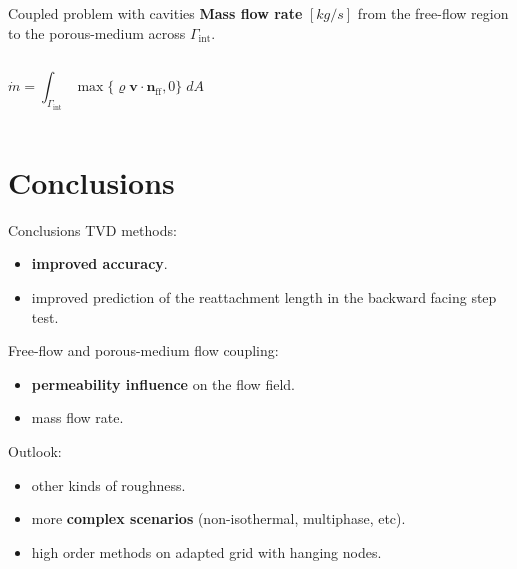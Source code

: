 \documentclass{beamer}
\begin{document}
%	
\begin{frame}{Coupled problem with cavities}
\textbf{Mass flow rate} $[\si{kg/s}]$ from the free-flow region to the porous-medium across $\Gamma_\text{int}$.
\begin{columns}
	\begin{equation*}
	\dot{m} = \int_{\Gamma_\text{int}} \max \{ \varrho \mathbf{v} \cdot 
	\mathbf{n}_\text{ff} , 0 \} \; dA
	\end{equation*}
	\begin{figure}
		\centering
		
	\end{figure}
\end{columns}
\end{frame}
\section{Conclusions}
\begin{frame}{Conclusions}
TVD methods:
\begin{itemize}
	\item \textbf{improved accuracy}.
	\item improved prediction of the reattachment length in the backward facing step test.
\end{itemize}
Free-flow and porous-medium flow coupling:
\begin{itemize}
	\item \textbf{permeability influence} on the flow field.
	\item mass flow rate.
\end{itemize}
\pause
Outlook:
\begin{itemize}
	\item other kinds of roughness.
	\item more \textbf{complex scenarios} (non-isothermal, multiphase, etc).
	\item high order methods on adapted grid with hanging nodes.
\end{itemize}
\end{frame}
\end{document}
